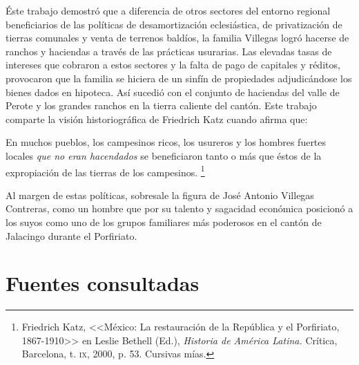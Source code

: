 \documentclass[14pt,twoside,final]{extbook} %
\let\oldfootnote\footnote
\renewcommand\footnote[1]{%
\oldfootnote{\hspace{1mm}#1}}
\begin{document}
Éste trabajo demostró que a diferencia de otros sectores del entorno regional beneficiarios de las políticas de desamortización eclesiástica, de privatización de tierras comunales y venta de terrenos baldíos, la familia Villegas logró hacerse de ranchos y haciendas a través de las prácticas usurarias. Las elevadas tasas de intereses que cobraron a estos sectores y la falta de pago de capitales y réditos, provocaron que la familia se hiciera de un sinfín de propiedades adjudicándose los bienes dados en hipoteca. Así sucedió con el conjunto de haciendas del valle de Perote y los grandes ranchos en la tierra caliente del cantón. Este trabajo comparte la visión historiográfica de Friedrich Katz cuando afirma que:
\begin{quoting}
En muchos pueblos, los campesinos ricos, los usureros y los hombres fuertes locales \emph{que no eran hacendados} se beneficiaron tanto o más que éstos de la expropiación de las tierras de los campesinos.\footnote{Friedrich Katz, <<México: La restauración de la República y el Porfiriato, 1867-1910>> en Leslie Bethell (Ed.), \emph{Historia de América Latina.} Crítica, Barcelona, t. \textsc{ix}, 2000, p. 53. Cursivas mías.}
\end{quoting}
Al margen de estas políticas, sobresale la figura de José Antonio Villegas Contreras, como un hombre que por su talento y sagacidad económica posicionó a los suyos como uno de los grupos familiares más poderosos en el cantón de Jalacingo durante el Porfiriato.
\newpage
\pagestyle{empty}
\null\vfill
\chapter*{Fuentes consultadas}\label{ch:fuentes-consultadas}
\thispagestyle{empty}
\pagestyle{fancy}
\fancyhf{} %
\fancyhead[RO,LE]{\thepage}
\renewcommand{\headrulewidth}{0pt}
\setcounter{page}{131}
\end{document}
